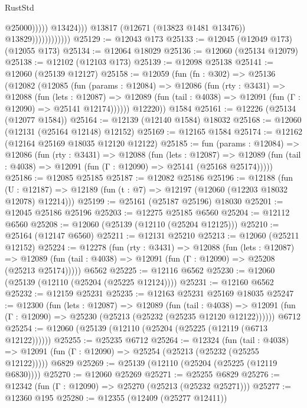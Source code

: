 \begin{lexlean}{RustStd}
\begin{coremodule}
                                            @25000)))))
                                  @13424)))
                            @13817
                            (@12671 (@13823 @1481 @13476))
                            @13829))))))))))))
@25129 := @12043 @173
@25133 := @12045 (@12049 @173) (@12055 @173)
@25134 := @12064 @18029
@25136 := @12060 (@25134 @12079)
@25138 := @12102 (@12103 @173)
@25139 := @12098 @25138
@25141 := @12060 (@25139 @12127)
@25158 := @12059
    (fun (fn : @302) =>
    @25136
      (@12082
        (@12085
          (fun (params : @12084) =>
          @12086
            (fun (rty : @3431) =>
            @12088
              (fun (lets : @12087) =>
              @12089 (fun (tail : @4038) => @12091 (fun (Γ : @12090) => @25141 @12174))))))
        @12220))
    @1584
@25161 := @12226 (@25134 (@12077 @1584))
@25164 := @12139 (@12140 @1584) @18032
@25168 := @12060 (@12131 (@25164 @12148) @12152)
@25169 := @12165 @1584
@25174 := @12162 (@12164 @25169 @18035 @12120 @12122)
@25185 := fun (params : @12084) =>
  @12086
    (fun (rty : @3431) =>
    @12088
      (fun (lets : @12087) =>
      @12089 (fun (tail : @4038) => @12091 (fun (Γ : @12090) => @25141 (@25168 @25174)))))
@25186 := @12085 @25185
@25187 := @12082 @25186
@25196 := @12188
    (fun (U : @12187) => @12189 (fun (t : @7) => @12197 (@12060 (@12203 @18032 @12078) @12214)))
@25199 := @25161 (@25187 @25196) @18030
@25201 := @12045 @25186 @25196
@25203 := @12275 @25185 @6560
@25204 := @12112 @6560
@25208 := @12060 (@25139 (@12110 (@25204 @12125)))
@25210 := @25164 (@12147 @6560)
@25211 := @12131 @25210
@25213 := @12060 (@25211 @12152)
@25224 := @12278
    (fun (rty : @3431) =>
    @12088
      (fun (lets : @12087) =>
      @12089 (fun (tail : @4038) => @12091 (fun (Γ : @12090) => @25208 (@25213 @25174)))))
    @6562
@25225 := @12116 @6562
@25230 := @12060 (@25139 (@12110 (@25204 (@25225 @12124))))
@25231 := @12160 @6562
@25232 := @12159 @25231
@25235 := @12163 @25231 @25169 @18035
@25247 := @12300
    (fun (lets : @12087) =>
    @12089
      (fun (tail : @4038) =>
      @12091 (fun (Γ : @12090) => @25230 (@25213 (@25232 (@25235 @12120 @12122))))))
    @6712
@25254 := @12060 (@25139 (@12110 (@25204 (@25225 (@12119 (@6713 @12122))))))
@25255 := @25235 @6712
@25264 := @12324
    (fun (tail : @4038) => @12091 (fun (Γ : @12090) => @25254 (@25213 (@25232 (@25255 @12122)))))
    @6829
@25269 := @25139 (@12110 (@25204 (@25225 (@12119 @6830))))
@25270 := @12060 @25269
@25271 := @25255 @6829
@25276 := @12342 (fun (Γ : @12090) => @25270 (@25213 (@25232 @25271)))
@25277 := @12360 @195
@25280 := @12355 (@12409 (@25277 @12411))

\end{coremodule}
\end{lexlean}
